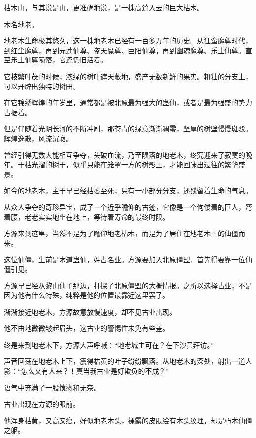 
\begin{this_body}



枯木山，与其说是山，更准确地说，是一株高耸入云的巨大枯木。

木名地老。

地老木生命极其悠久，这一株地老木已经有一百多万年的历史。从狂蛮魔尊时代，到红尘魔尊，再到元莲仙尊、盗天魔尊、巨阳仙尊，再到幽魂魔尊、乐土仙尊。直至乐土仙尊陨落，它还仍旧活着。

它枝繁叶茂的时候，浓绿的树叶遮天蔽地，盛产无数新鲜的果实。粗壮的分支上，可以开辟出独特的树田。

在它锦绣辉煌的年岁里，通常都是被北原最为强大的蛊仙，或者是最为强盛的势力占据着。

但是伴随着光阴长河的不断冲刷，那苍青的绿意渐渐凋零，坚厚的树壁慢慢斑驳。辉煌逸散，风流沉寂。

曾经引得无数大能相互争夺，头破血流，乃至陨落的地老木，终究迎来了寂寞的晚年。干枯光溜的树干，似乎只能在笼罩一方的树影上，才能回味出过往的繁华盛景。

如今的地老木，主干早已经枯萎至死，只有一小部分分支，还残留着生命的气息。

从众人争夺的奇珍异宝，成了一个近乎瞻仰的古迹，它像是一个佝偻着的巨人，弯着腰，老老实实地坐在地上，等待着寿命的最终时限。

方源来到这里，当然不是为了瞻仰地老枯木，而是为了居住在地老木上的仙僵而来。

这位仙僵，生前是木道蛊仙，姓古名业。方源要加入北原僵盟，首先得要靠一位仙僵引见。

方源早已经从黎山仙子那边，打探了北原僵盟的大概情报。之所以选择古业，不是因为他有什么特殊，纯粹是他的位置最靠近这里罢了。

渐渐接近地老木，方源故意放慢速度，却不见古业出现。

他不由地微微皱起眉头，这古业的警惕性未免有些差。

终是来到地老木下，方源大声呼喊：“地老城主可在？在下沙黄拜访。”

声音回荡在地老木上下，震得枯黄的叶子纷纷飘落。从地老木的深处，射出一道人影：“怎么又有人来？！真当我古业是好欺负的不成？”

语气中充满了一股愤懑和无奈。

古业出现在方源的眼前。

他浑身枯黄，又高又瘦，好似地老木头，裸露的皮肤绘有木头纹理，却是朽木仙僵之躯。


\end{this_body}

